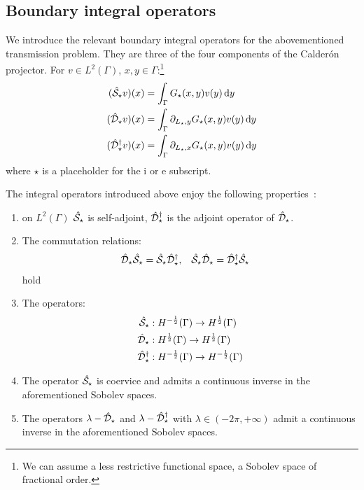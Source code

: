 \subsection{Boundary integral operators}
We introduce the relevant boundary integral operators for the abovementioned
transmission problem. They are three of the four components of the Calder\'on projector.
For $v \in L^2(\Gamma)$, $x, y \in \Gamma$:\footnote{We can assume a less restrictive functional space, \ie a Sobolev space of fractional order.}
\begin{equation}
\begin{aligned}
(\hat{\mathcal{S}}_\star v)(x) &= \int_\Gamma G_\star(x, y)v(y)\mathop{}\!\mathrm{d} y \\
(\hat{\mathcal{D}}_\star v)(x) &= \int_\Gamma \partial_{L_\star,y}G_\star(x, y)v(y)\mathop{}\!\mathrm{d} y \\
(\hat{\mathcal{D}}^\dagger_\star v)(x) &= \int_\Gamma \partial_{L_\star,x}G_\star(x, y)v(y)\mathop{}\!\mathrm{d} y \\
\end{aligned}
\end{equation}
where $\star$ is a placeholder for the $\mathrm{i}$ or $\mathrm{e}$ subscript.

\begin{lemma}
  The integral operators introduced above enjoy the following
  properties~\autocite{Hsiao2008, Sauter2011}:
  \begin{enumerate}
      \item on $L^2(\Gamma)$ $\hat{\mathcal{S}}_\star$ is self-adjoint,
        $\hat{\mathcal{D}}^\dagger_\star$ is the adjoint operator of
        $\hat{\mathcal{D}}_\star$.
      \item The commutation relations:
        \begin{alignat}{2}
          \hat{\mathcal{D}}_\star\hat{\mathcal{S}}_\star = \hat{\mathcal{S}}_\star\hat{\mathcal{D}}^\dagger_\star, \quad&
          \hat{\mathcal{S}}_\star\hat{\mathcal{D}}_\star = \hat{\mathcal{D}}^\dagger_\star\hat{\mathcal{S}}_\star
        \end{alignat}
        hold
      \item The operators:
        \begin{subequations}
          \begin{align}
   \hat{\mathcal{S}}_\star &: H^{-\frac{1}{2}}(\Gamma) \rightarrow H^{\frac{1}{2}}(\Gamma) \\
   \hat{\mathcal{D}}_\star &: H^{\frac{1}{2}}(\Gamma) \rightarrow H^{\frac{1}{2}}(\Gamma) \\
   \hat{\mathcal{D}}^\dagger_\star &: H^{-\frac{1}{2}}(\Gamma) \rightarrow H^{-\frac{1}{2}}(\Gamma)
          \end{align}
        \end{subequations}
      \item The operator $\hat{\mathcal{S}}_\star$ is coervice and admits a
        continuous inverse in the aforementioned Sobolev spaces.
      \item The operators $\lambda - \hat{\mathcal{D}}_\star$ and $\lambda -
        \hat{\mathcal{D}}^\dagger_\star$ with $\lambda \in (-2\pi, +\infty)$
        admit a continuous inverse in the aforementioned
        Sobolev spaces.
  \end{enumerate}
\end{lemma}

